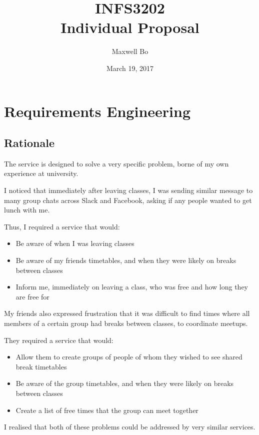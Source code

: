 \documentclass[11pt,a4paper]{report}
\begin{document}
\title{INFS3202 \\ Individual Proposal}
\author{Maxwell Bo}
\date{March 19, 2017}
\maketitle

\chapter{Requirements Engineering}

\section{Rationale}


The service is designed to solve a very specific problem, borne of my own experience at university.

I noticed that immediately after leaving classes, I was sending similar message to many group chats across Slack and Facebook, asking if any people wanted to get lunch with me.

Thus, I required a service that would:

\begin{itemize}
    \item Be aware of when I was leaving classes
    \item Be aware of my friends timetables, and when they were likely on breaks between classes
    \item Inform me, immediately on leaving a class, who was free and how long they are free for
\end{itemize}

My friends also expressed frustration that it was difficult to find times where all members of a certain group had breaks between classes, to coordinate meetups.

They required a service that would:

\begin{itemize}
    \item Allow them to create groups of people of whom they wished to see shared break timetables
    \item Be aware of the group timetables, and when they were likely on breaks between classes
    \item Create a list of free times that the group can meet together
\end{itemize}

I realised that both of these problems could be addressed by very similar services. 
\end{document}
